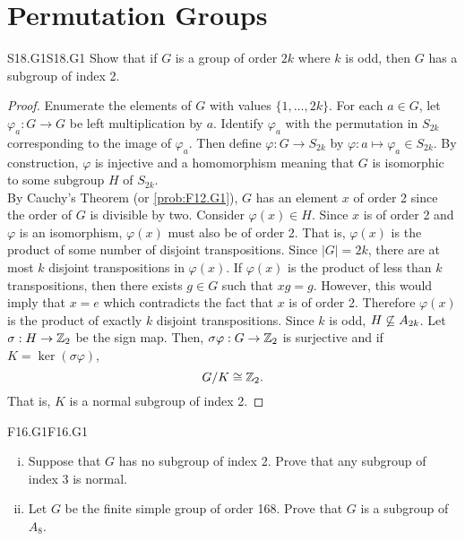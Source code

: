 \documentclass[../AlgebraQualSolutions.tex]{subfiles}
\begin{document}
\section{Permutation Groups}

\begin{prob}{S18.G1}{S18.G1}
    Show that if $G$ is a group of order $2k$ where $k$ is odd, then $G$ has a subgroup of index 2.
\end{prob}

\begin{proof}
    Enumerate the elements of $G$ with values $\{1,\ldots, 2k\}$. For each $a \in G$, let $\varphi_a: G \to G$ be left multiplication by $a$. Identify $\varphi_a$ with the permutation in $S_{2k}$ corresponding to the image of $\varphi_a$. Then define $\varphi: G \to S_{2k}$ by $\varphi: a \mapsto \varphi_{a} \in S_{2k}$. By construction, $\varphi$ is injective and a homomorphism meaning that $G$ is isomorphic to some subgroup $H$ of $S_{2k}$.\\

    By Cauchy's Theorem (or \ref{prob:F12.G1}), $G$ has an element $x$ of order 2 since the order of $G$ is divisible by two. Consider $\varphi(x) \in H$. Since $x$ is of order 2 and $\varphi$ is an isomorphism, $\varphi(x)$ must also be of order 2. That is, $\varphi(x)$ is the product of some number of disjoint transpositions. Since $|G| = 2k$, there are at most $k$ disjoint transpositions in $\varphi(x)$. If $\varphi(x)$ is the product of less than $k$ transpositions, then there exists $g \in G$ such that $xg = g$. However, this would imply that $x = e$ which contradicts the fact that $x$ is of order 2. Therefore $\varphi(x)$ is the product of exactly $k$ disjoint transpositions. Since $k$ is odd, $H \not\subseteq A_{2k}$. Let $\sigma: H \to \mathbb{Z}_2$ be the sign map. Then, $\sigma\varphi: G \to \mathbb{Z}_2$ is surjective and if $K = \ker(\sigma\varphi)$,
        \[G/K \cong \mathbb{Z}_2.\]
    That is, $K$ is a normal subgroup of index 2.
\end{proof}

\begin{prob}{F16.G1}{F16.G1}
    \begin{enumerate}[(i)]
        \item Suppose that $G$ has no subgroup of index 2. Prove that any subgroup of index 3 is normal.
        \item Let $G$ be the finite simple group of order 168. Prove that $G$ is a subgroup of $A_8$.
    \end{enumerate}
\end{prob}
\end{document}
